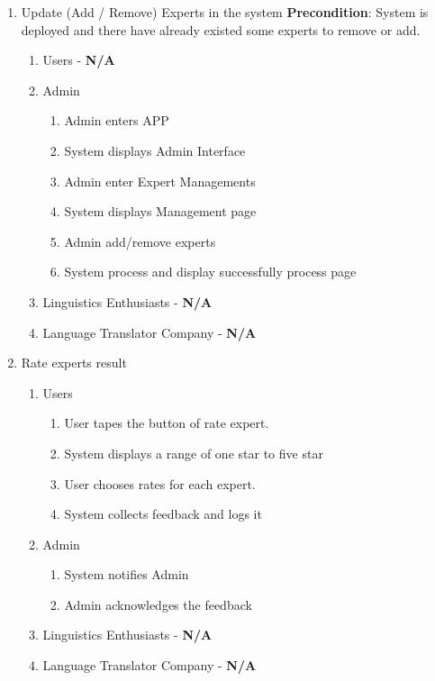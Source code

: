 \begin{enumerate}[{\bf BE1.}]
	\item Update (Add / Remove) Experts in the system 
	\textbf{Precondition}: System is deployed and there have already existed some experts to remove or add.
	\begin{enumerate}[{\bf VP1.}]
		\item Users - \textbf{N/A}
		\item Admin
		\begin{enumerate}
			\item Admin enters APP
			\item System displays Admin Interface
			\item Admin enter Expert Managements
			\item System displays Management page
			\item Admin add/remove experts
			\item System process and display successfully process page

		\end{enumerate}
		\item Linguistics Enthusiasts - \textbf{N/A}
		\item Language Translator Company - \textbf{N/A}
	\end{enumerate}


	\item Rate experts result 
	\begin{enumerate}[{\bf VP1.}]
		\item Users
		\begin{enumerate}[{\bf 1.}]
			\item User tapes the button of rate expert.
			\item System displays a range of one star to five star
			\item User chooses rates for each expert.
			\item System collects feedback and logs it
		\end{enumerate}
		\item Admin
		\begin{enumerate}[{\bf 6.}]
			\item System notifies Admin
			\item Admin acknowledges the feedback
		\end{enumerate}
		\item Linguistics Enthusiasts - \textbf{N/A}
		\item Language Translator Company - \textbf{N/A}
	\end{enumerate}
\end{enumerate}



